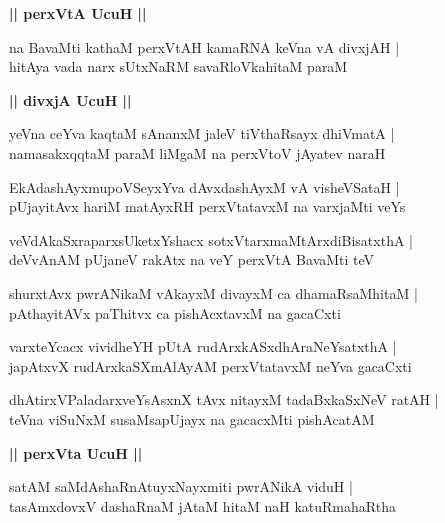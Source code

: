 \documentclass[twoside,12pt,openright]{book}
\newcounter{shloka}[chapter]
\def\uvaca#1{\centerline{{\large\textbf{#1}}}}
\begin{document}
\uvaca{|| perxVtA UcuH ||}

\begin{shloka}%
na BavaMti kathaM perxVtAH kamaRNA keVna vA divxjAH |\\
hitAya vada narx sUtxNaRM savaRloVkahitaM paraM 
\end{shloka}

\uvaca{|| divxjA UcuH ||}

\begin{shloka}%
yeVna ceYva kaqtaM sAnanxM jaleV tiVthaRsayx dhiVmatA |\\
namasakxqqtaM paraM liMgaM na perxVtoV jAyatev naraH 
\end{shloka}

\begin{shloka}%
EkAdashAyxmupoVSeyxYva dAvxdashAyxM vA visheVSataH |\\
pUjayitAvx hariM matAyxRH perxVtatavxM na varxjaMti veYs
\end{shloka}

\begin{shloka}%
veVdAkaSxraparxsUketxYshacx sotxVtarxmaMtArxdiBisatxthA |\\
deVvAnAM pUjaneV rakAtx na veY perxVtA BavaMti teV 
\end{shloka}

\begin{shloka}%
shurxtAvx pwrANikaM vAkayxM divayxM ca dhamaRsaMhitaM |\\
pAthayitAVx paThitvx ca pishAcxtavxM na gacaCxti 
\end{shloka}

\begin{shloka}%
varxteYcacx vividheYH pUtA rudArxkASxdhAraNeYsatxthA |\\
japAtxvX rudArxkaSXmAlAyAM perxVtatavxM neYva gacaCxti 
\end{shloka}

\begin{shloka}%
dhAtirxVPaladarxveYsAsxnX tAvx nitayxM tadaBxkaSxNeV ratAH |\\
teVna viSuNxM susaMsapUjayx na gacacxMti pishAcatAM 
\end{shloka}

\uvaca{|| perxVta UcuH ||}

\begin{shloka}%
satAM saMdAshaRnAtuyxNayxmiti pwrANikA viduH |\\
tasAmxdovxV dashaRnaM jAtaM hitaM naH katuRmahaRtha 
\end{shloka}
\end{document}
